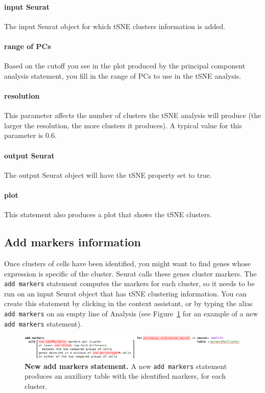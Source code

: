 \paragraph{input Seurat} The input Seurat object for which tSNE clusters information is added.

\paragraph{range of PCs} Based on the cutoff you see in the plot produced by the principal
component analysis statement, you fill in the range of PCs to use in the tSNE analysis.

\paragraph{resolution} This parameter affects the number of clusters the tSNE analysis will
produce (the larger the resolution, the more clusters it produces).
A typical value for this parameter is 0.6.

\paragraph{output Seurat} The output Seurat object will have the tSNE property set to true.

\paragraph{plot} This statement also produces a plot that shows the tSNE clusters.

\subsection{Add markers information}
Once clusters of cells have been identified, you might want to find genes whose expression is specific of the cluster. Seurat calls these genes cluster markers. The \texttt{add markers} statement computes the markers for each cluster, so it needs to be
run on an input Seurat object that has tSNE clustering information.
You can create this statement by clicking
 in the context assistant, or by typing
the alias \texttt{add markers} on an empty line of Analysis (see Figure~\ref{fig:AddMarkers}
for an example of a new \texttt{add markers} statement).

\begin{figure}[h!tbp]
  \centering
    \includegraphics[width=\figWidthWide]{figures/AddMarkers.png}
    \caption[New add markers statement.]{\textbf{New add markers statement.} A new
    \texttt{add markers} statement produces an auxiliary table with the identified markers, for each cluster.}
\label{fig:AddMarkers}
\end{figure}


